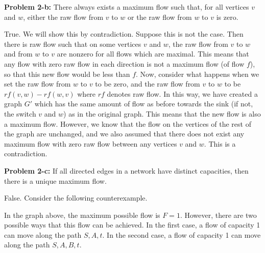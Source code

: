 \documentclass[psamsfonts]{amsart}
\newenvironment{sol}{\vspace{0.25cm}{\large \bfseries Solution:}}{\qedsymbol}
\newenvironment{prob}[1]{\begin{framed}{\large \bfseries Problem #1:}}{\end{framed}}
\begin{document}
\begin{prob}{2-b}
There always exists a maximum flow such that, for all vertices $v$ and $w$, either the raw flow from $v$ to $w$ or the raw flow from $w$ to $v$ is zero.
\end{prob}

\begin{sol}
True. We will show this by contradiction. Suppose this is not the case. Then there is raw flow such that on some vertices $v$ and $w$, the raw flow from $v$ to $w$ and from $w$ to $v$ are nonzero for all flows which are maximal. This means that any flow with zero raw flow in each direction is not a maximum flow (of flow $f$), so that this new flow would be less than $f$. Now, consider what happens when we set the raw flow from $w$ to $v$ to be zero, and the raw flow from $v$ to $w$ to be $rf(v,w) - rf(w,v)$ where $rf$ denotes raw flow. In this way, we have created a graph $G'$ which has the same amount of flow as before towards the sink (if not, the switch $v$ and $w$) as in the original graph. This means that the new flow is also a maximum flow. However, we know that the flow on the vertices of the rest of the graph are unchanged, and we also assumed that there does not exist any maximum flow with zero raw flow between any vertices $v$ and $w$. This is a contradiction.
\end{sol}

\begin{prob}{2-c}
If all directed edges in a network have distinct capacities, then there is a unique maximum flow.
\end{prob}

\begin{sol}
False. Consider the following counterexample.
\begin{figure}[h!]
\centering
{}
\end{figure}

In the graph above, the maximum possible flow is $F = 1$. However, there are two possible ways that this flow can be achieved. In the first case, a flow of capacity 1 can move along the path $S, A, t$. In the second case, a flow of capacity 1 can move along the path $S, A, B, t$.
\end{sol}
\end{document}
